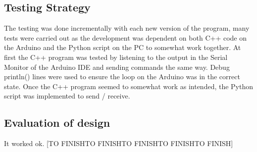 \subsection{Testing Strategy}
The testing was done incrementally with each new version of the program, many tests were carried out as the development was dependent on both C++ code on the Arduino and the Python script on the PC to somewhat work together. At first the C++ program was tested by listening to the output in the Serial Monitor of the Arduino IDE and sending commands the same way. Debug println() lines were used to ensure the loop on the Arduino was in the correct state. Once the C++ program seemed to somewhat work as intended, the Python script was implemented to send / receive. 

\subsection{Evaluation of design}
It worked ok. [TO FINISHTO FINISHTO FINISHTO FINISHTO FINISH]

